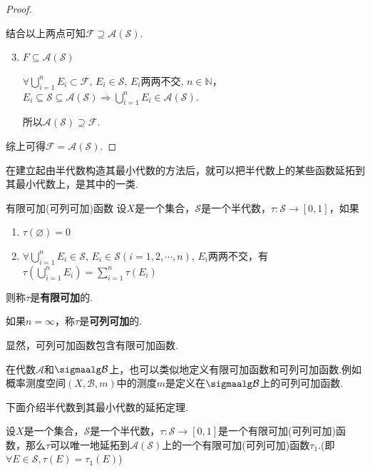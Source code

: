 \begin{proof}
\begin{enumerate}[label=(\arabic*)]
\begin{enumerate}[label=(\roman*)]
        \end{enumerate}
    \end{enumerate}\par
    结合以上两点可知$\mathcal{F}\supseteq\mathcal{A}(\mathcal{S})$.
    \begin{enumerate}[label=(\arabic*)]
        \setcounter{enumi}{2}
        \item $F\subseteq\mathcal{A}(\mathcal{S})$\par
        $\forall \bigcup_{i=1}^n{E_i}\subset\mathcal{F},\, E_i\in\mathcal{S},\, E_i\text{两两不交},\,n\in\mathbb{N}$，$E_i\subseteq\mathcal{S}\subseteq\mathcal{A}(\mathcal{S})\Rightarrow \bigcup_{i=1}^n{E_i}\in\mathcal{A}(\mathcal{S})$.\par
        所以$\mathcal{A}(\mathcal{S})\supseteq\mathcal{F}$.
    \end{enumerate}\par
    综上可得$\mathcal{F}=\mathcal{A}(\mathcal{S})$.
\end{proof}
在建立起由半代数构造其最小代数的方法后，就可以把半代数上的某些函数延拓到其最小代数上，是其中的一类.
\begin{definition}{有限可加(可列可加)函数}
    \wideline
    设$X$是一个集合，$\mathcal{S}$是一个半代数，$\tau:\mathcal{S}\to[0,1]$，如果
    \begin{enumerate}
        \item $\tau(\varnothing)=0$
        \item $\forall\bigcup_{i=1}^n{E_i}\in\mathcal{S},\, E_i\in\mathcal{S}(i=1,2,\cdots,n),\, E_i两两不交$，有$\tau\left(\bigcup_{i=1}^n{E_i}\right)=\sum_{i=1}^n{\tau(E_i)}$
    \end{enumerate}
    则称$\tau$是\textbf{有限可加}的.\par
    如果$n=\infty$，称$\tau$是\textbf{可列可加}的.
\end{definition}
显然，可列可加函数包含有限可加函数.\par
在代数$\mathcal{A}$和$\sigmaalg\mathcal{B}$上，也可以类似地定义有限可加函数和可列可加函数.例如概率测度空间$(X,\mathcal{B},m)$中的测度$m$是定义在$\sigmaalg\mathcal{B}$上的可列可加函数.\par
下面介绍半代数到其最小代数的延拓定理.\par
\begin{theorem}
    设$X$是一个集合，$\mathcal{S}$是一个半代数，$\tau:\mathcal{S}\to[0,1]$是一个有限可加(可列可加)函数，那么$\tau$可以唯一地延拓到$\mathcal{A}(\mathcal{S})$上的一个有限可加(可列可加)函数$\tau_1$.(即$\forall E\in\mathcal{S},\tau(E)=\tau_1(E)$)
\end{theorem}
